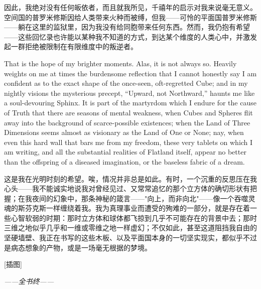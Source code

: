 \documentclass[12pt,UTF8]{ctexbook}
\begin{document}
因此，我绝对没有任何皈依者，而且就我所见，千禧年的启示对我来说毫无意义。空间国的普罗米修斯因给人类带来火种而被缚，但我——可怜的平面国普罗米修斯——躺在这里的监狱里，因为我没有给同胞带来任何东西。然而，我仍抱有希望——这些回忆录也许能以某种我不知道的方式，到达某个维度的人类心中，并激发起一群拒绝被限制在有限维度中的叛逆者。

That is the hope of my brighter moments. Alas, it is not always so. Heavily weights on me at times the burdensome reflection that I cannot honestly say I am confident as to the exact shape of the once-seen, oft-regretted Cube; and in my nightly visions the mysterious precept, ``Upward, not Northward,'' haunts me like a soul-devouring Sphinx. It is part of the martyrdom which I endure for the cause of Truth that there are seasons of mental weakness, when Cubes and Spheres flit away into the background of scarce-possible existences; when the Land of Three Dimensions seems almost as visionary as the Land of One or None; nay, when even this hard wall that bars me from my freedom, these very tablets on which I am writing, and all the substantial realities of Flatland itself, appear no better than the offspring of a diseased imagination, or the baseless fabric of a dream.

这是我在光明时刻的希望。唉，情况并非总是如此。有时，一个沉重的反思压在我心头——我不能诚实地说我对曾经见过、又常常追忆的那个立方体的确切形状有把握；在我夜间的幻象中，那条神秘的箴言——"向上，而非向北"——像一个吞噬灵魂的斯芬克斯一样缠绕着我。我为真理事业而遭受的殉难的一部分，就是存在着一些心智软弱的时期：那时立方体和球体都飞掠到几乎不可能存在的背景中去；那时三维之地似乎几乎和一维或零维之地一样虚幻；不仅如此，甚至这道阻挡我自由的坚硬墙壁、我正在书写的这些木板、以及平面国本身的一切坚实现实，都似乎不过是病态想象的产物，或是一场毫无根据的梦境。

[插图]

\backmatter

\begin{flushright}
\textit{——全书终——}
\end{flushright}
\end{document}
